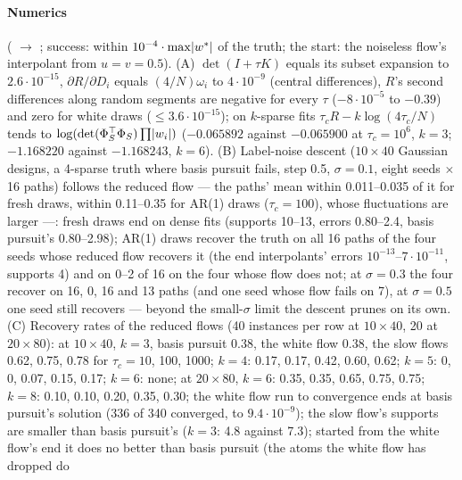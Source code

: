 \begin{sloppypar}
\paragraph{Numerics} ( $\to$ ; success: within
$10^{-4}\cdot\max\lvert w^*\rvert$ of the truth; the start: the noiseless flow's interpolant from $u = v = 0.5$). (A)
$\det(I + \tau K)$ equals its subset expansion to $2.6\cdot10^{-15}$, $\partial R/\partial D_i$ equals $(4/N)\omega_i$ to
$4\cdot10^{-9}$ (central differences), $R$'s second differences along random segments are negative for every $\tau$
($-8\cdot10^{-5}$ to $-0.39$) and zero for white draws ($\le3.6\cdot10^{-15}$); on $k$-sparse fits
$\tau_cR - k\log(4\tau_c/N)$ tends to $\log(\det(\Phi_S^\top\Phi_S)\prod\lvert w_i\rvert)$ ($-0.065892$ against $-0.065900$ at
$\tau_c = 10^6$, $k = 3$; $-1.168220$ against $-1.168243$, $k = 6$). (B) Label-noise descent ($10\times40$ Gaussian
designs, a 4-sparse truth where basis pursuit fails, step 0.5, $\sigma = 0.1$, eight seeds $\times$ 16 paths) follows
the reduced flow --- the paths' mean within 0.011--0.035 of it for fresh draws, within 0.11--0.35 for AR(1) draws
($\tau_c = 100$), whose fluctuations are larger ---: fresh draws end on dense fits (supports 10--13, errors 0.80--2.4,
basis pursuit's 0.80--2.98); AR(1) draws recover the truth on all 16 paths of the four seeds whose reduced flow recovers
it (the end interpolants' errors $10^{-13}$--$7\cdot10^{-11}$, supports 4) and on 0--2 of 16 on the four whose flow does
not; at $\sigma = 0.3$ the four recover on 16, 0, 16 and 13 paths (and one seed whose flow fails on 7), at
$\sigma = 0.5$ one seed still recovers --- beyond the small-$\sigma$ limit the descent prunes on its own. (C) Recovery
rates of the reduced flows (40 instances per row at $10\times40$, 20 at $20\times80$): at $10\times40$, $k = 3$, basis
pursuit 0.38, the white flow 0.38, the slow flows 0.62, 0.75, 0.78 for $\tau_c = 10$, 100, 1000; $k = 4$: 0.17, 0.17,
0.42, 0.60, 0.62; $k = 5$: 0, 0, 0.07, 0.15, 0.17; $k = 6$: none; at $20\times80$, $k = 6$: 0.35, 0.35, 0.65, 0.75,
0.75; $k = 8$: 0.10, 0.10, 0.20, 0.35, 0.30; the white flow run to convergence ends at basis pursuit's solution (336 of
340 converged, to $9.4\cdot10^{-9}$); the slow flow's supports are smaller than basis pursuit's ($k = 3$: 4.8 against
7.3); started from the white flow's end it does no better than basis pursuit (the atoms the white flow has dropped do

\end{sloppypar}
